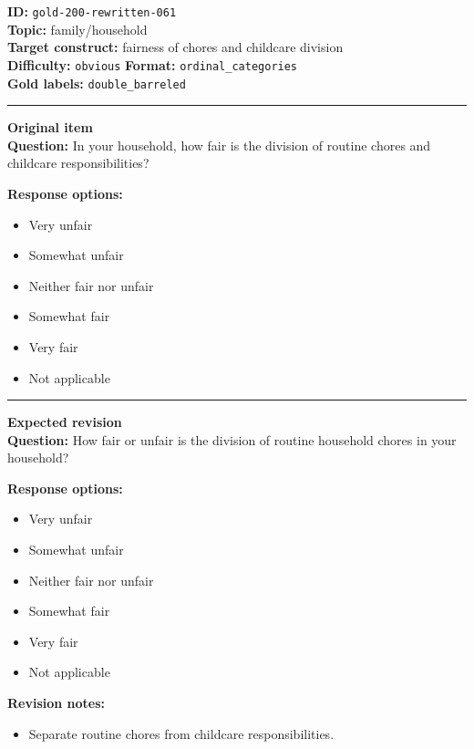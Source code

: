 \documentclass[10pt,a4paper]{article}
\newcommand{\sectionline}{\vspace{0.15em}\hrule\vspace{0.35em}}
\begin{document}
\begin{tcolorbox}[colframe=FlawRed,colback=white,colbacktitle=FlawRed!9,coltitle=black,title={Item 061\hfill Flawed item}]
\textbf{ID:} \texttt{gold-200-rewritten-061}\\
\textbf{Topic:} family/household\\
\textbf{Target construct:} fairness of chores and childcare division\\
\textbf{Difficulty:} \texttt{obvious} \quad \textbf{Format:} \texttt{ordinal\_categories}\\
\textbf{Gold labels:} \texttt{double\_barreled}\\
\sectionline
\textbf{Original item}\\
\textbf{Question:} In your household, how fair is the division of routine chores and childcare responsibilities?
\par\textbf{Response options:}
\begin{itemize}
\item Very unfair
\item Somewhat unfair
\item Neither fair nor unfair
\item Somewhat fair
\item Very fair
\item Not applicable
\end{itemize}
\sectionline
\textbf{Expected revision}\\
\textbf{Question:} How fair or unfair is the division of routine household chores in your household?
\par\textbf{Response options:}
\begin{itemize}
\item Very unfair
\item Somewhat unfair
\item Neither fair nor unfair
\item Somewhat fair
\item Very fair
\item Not applicable
\end{itemize}
\par\textbf{Revision notes:}
\begin{itemize}
\item Separate routine chores from childcare responsibilities.
\end{itemize}
\end{tcolorbox}
\end{document}
